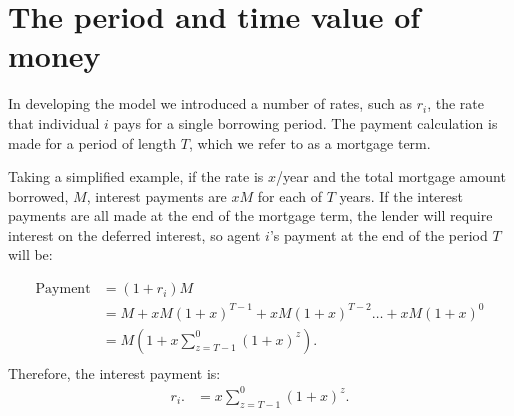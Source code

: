 

\section{The period and time value of money}\label{sec_model_time}
In developing the model we introduced a number of rates, such as $r_i$, the rate that individual $i$ pays for a single borrowing period. The payment calculation is made for a period of length $T$, which we refer to as a mortgage term.

Taking a simplified example, if the rate is $x$/year  and  the total mortgage amount borrowed, $M$, interest payments are $xM$  for each of $T$ years. 
If the interest payments are all made at the end of the mortgage term, the lender will require interest on the deferred interest, so agent $i$'s payment at the end of the period $T$ will be:

\begin{align*}
\text{Payment} &= (1+r_i)M                                 \\ 
    &= M + xM(1+x)^{T-1}+ xM(1+x)^{T-2}\dots + xM(1+x)^{0} \\
    &= M\left(1+ x\sum_{z=T-1}^0(1+x)^{z}\right).          \\ 
\end{align*}
Therefore, the interest payment is:
\begin{align*}
r_i.   &=x\sum_{z=T-1}^0(1+x)^{z}.
\end{align*}

